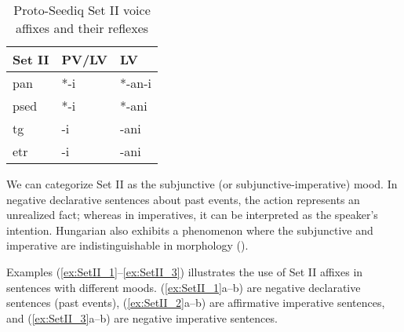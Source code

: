 \begin{table}[!htbp]
\centering
\caption{Proto-Seediq Set II voice affixes and their reflexes}
\label{tab:psed_voi_II}
\begin{tabular}{lll}
\hline
Set II    & PV/LV & LV     \\ \hline
\ac{pan}  & *-i   & *-an-i \\
\ac{psed} & *-i   & *-ani  \\
\ac{tg}   & -i    & -ani   \\
\ac{etr}  & -i    & -ani   \\ \hline
\end{tabular}
\end{table}

We can categorize Set II as the subjunctive (or subjunctive-imperative) mood. In negative declarative sentences about past events, the action represents an unrealized fact; whereas in imperatives, it can be interpreted as the speaker's intention. Hungarian also exhibits a phenomenon where the subjunctive and imperative are indistinguishable in morphology (\cite{toth2007}).

Examples (\ref{ex:SetII_1}--\ref{ex:SetII_3}) illustrates the use of Set II affixes in sentences with different moods. (\ref{ex:SetII_1}a--b) are negative declarative sentences (past events), (\ref{ex:SetII_2}a--b) are affirmative imperative sentences, and (\ref{ex:SetII_3}a--b) are negative imperative sentences.

